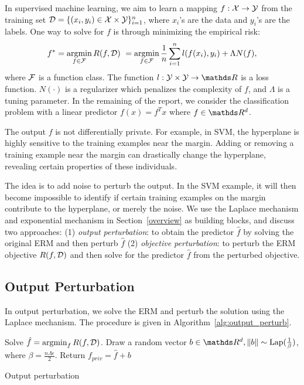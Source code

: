 \documentclass{article} %
\begin{document}
In supervised machine learning, we aim to learn a mapping $f: \mathcal{X} \rightarrow \mathcal{Y}$ from the training set $\mathcal{D} = \{(x_i, y_i) \in \mathcal{X} \times \mathcal{Y}\}_{i=1}^n$, where $x_i$'s are the data and $y_i$'s are the labels. One way to solve for $f$ is through minimizing the empirical risk:
$$f^* = \argmin_{f\in \F} R(f, \Dc) \ =\argmin_{f\in \F} \frac{1}{n}\sum_{i=1}^n l(f(x_i), y_i) + \Lambda N(f),$$
where $\mathcal{F}$ is a function class. The function $l:\Y \times \Y \rightarrow \R$ is a loss function. $N(\cdot)$ is a regularizer which penalizes the complexity of $f$, and $\Lambda$ is a tuning parameter. In the remaining of the report, we consider the classification problem with a linear predictor $f(x) = f^T x$ where $f\in \R^d$.

The output $f$ is not differentially private. For example, in SVM, the hyperplane is highly sensitive to the training examples near the margin. Adding or removing a training example near the margin can drastically change the hyperplane, revealing certain properties of these individuals.

The idea is to add noise to perturb the output. In the SVM example, it will then become impossible to identify if certain training examples on the margin contribute to the hyperplane, or merely the noise. We use the Laplace mechanism and exponential mechanism in Section~\ref{overview} as building blocks, and discuss two approaches: (1) \emph{output perturbation}: to obtain the predictor $\hat{f}$ by solving the original ERM and then perturb $\hat{f}$ (2) \emph{objective perturbation}: to perturb the ERM objective $R(f, \mathcal{D})$ and then solve for the predictor $\hat{f}$ from the perturbed objective.

\subsection{Output Perturbation}
In output perturbation, we solve the ERM and perturb the solution using the Laplace mechanism. The procedure is given in Algorithm~\ref{alg:output_perturb}.

\begin{algorithm}[htb]
\begin{algorithmic}[1]
    \State Solve $\hat{f} = \operatorname*{argmin}_f R(f, \mathcal{D})$.
    \State Draw a random vector $b\in \R^d, \norm{b}\sim \text{Lap}(\frac{1}{\beta})$, where $\beta = \frac{n\Lambda \epsilon}{2}$.
    \State Return $f_{priv} = \hat{f} + b$
   \EndFunction
\end{algorithmic}
\caption{Output perturbation}\label{alg:output_perturb}
\end{algorithm}
\end{document}
